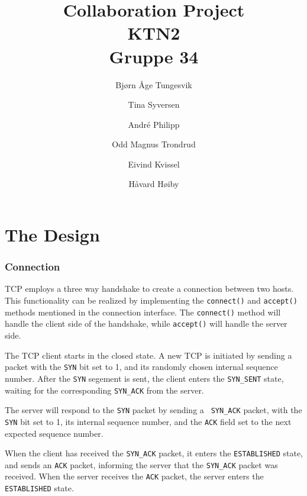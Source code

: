 \documentclass{article}
\begin{document}
\begin{titlepage}
\title{Collaboration Project\\
\textbf{KTN2}\\
Gruppe 34}
\author{Bj\o rn \AA ge Tungesvik\and Tina Syversen\and Andr\'e Philipp\and Odd Magnus Trondrud\and Eivind Kvissel\and H\aa vard H\o iby}
\maketitle
\end{titlepage}\qquad 

\part{The Design}

\section{Connection}

TCP employs a three way handshake to create a connection between two hosts.
This functionality can be realized by implementing the \texttt{connect()}
and \texttt{accept()} methods mentioned in the connection interface. The 
\texttt{connect()} method will handle the client side of the handshake,
while \texttt{accept()} will handle the server side.

\bigskip

The TCP client starts in the closed state. A new TCP is initiated by sending
a packet with the \texttt{SYN} bit set to 1, and its randomly chosen
internal sequence number. After the \texttt{SYN} segement is sent, the
client enters the \texttt{\texttt{SYN}\_SENT} state, waiting for the
corresponding \texttt{\texttt{SYN}\_ACK} from the server.

\bigskip

The server will respond to the \texttt{SYN} packet by sending a \texttt{%
\texttt{SYN}\_ACK} packet, with the \texttt{SYN} bit set to 1, its internal
sequence number, and the \texttt{ACK} field set to the next expected
sequence number.

\bigskip

When the client has received the \texttt{\texttt{SYN}\_ACK} packet, it
enters the \texttt{ESTABLISHED} state, and sends an \texttt{ACK} packet,
informing the server that the \texttt{\texttt{SYN}\_ACK} packet was
received. When the server receives the \texttt{ACK} packet, the server
enters the \texttt{ESTABLISHED} state.
\end{document}
